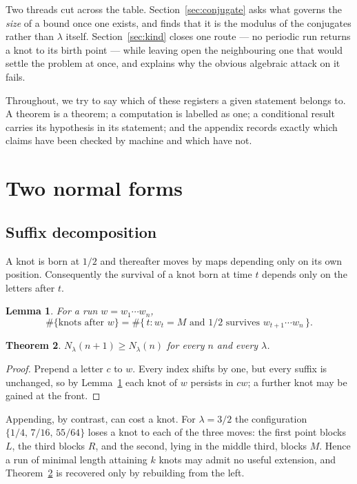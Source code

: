 \documentclass[11pt,reqno]{amsart}
\theoremstyle{plain}
\newtheorem{theorem}{Theorem}
\newtheorem{lemma}[theorem]{Lemma}
\theoremstyle{definition}
\theoremstyle{remark}
\begin{document}
Two threads cut across the table. Section~\ref{sec:conjugate} asks what governs
the \emph{size} of a bound once one exists, and finds that it is the modulus of
the conjugates rather than $\lambda$ itself. Section~\ref{sec:kind} closes one
route --- no periodic run returns a knot to its birth point --- while leaving
open the neighbouring one that would settle the problem at once, and explains
why the obvious algebraic attack on it fails.

Throughout, we try to say which of these registers a given statement belongs
to. A theorem is a theorem; a computation is labelled as one; a conditional
result carries its hypothesis in its statement; and the appendix records
exactly which claims have been checked by machine and which have not.

\section{Two normal forms}\label{sec:normal}

\subsection{Suffix decomposition}

A knot is born at $1/2$ and thereafter moves by maps depending only on its own
position. Consequently the survival of a knot born at time $t$ depends only on
the letters after $t$.

\begin{lemma}\label{lem:suffix}
For a run $w=w_1\cdots w_n$,
\[
  \#\{\text{knots after } w\}
   =\#\{\,t : w_t=M \text{ and } 1/2 \text{ survives } w_{t+1}\cdots w_n\,\}.
\]
\end{lemma}

\begin{theorem}\label{thm:mono}
$N_\lambda(n+1)\geq N_\lambda(n)$ for every $n$ and every $\lambda$.
\end{theorem}

\begin{proof}
Prepend a letter $c$ to $w$. Every index shifts by one, but every suffix is
unchanged, so by Lemma~\ref{lem:suffix} each knot of $w$ persists in $cw$; a
further knot may be gained at the front.
\end{proof}

Appending, by contrast, can cost a knot. For $\lambda=3/2$ the configuration
$\{1/4,\,7/16,\,55/64\}$ loses a knot to each of the three moves: the first
point blocks $L$, the third blocks $R$, and the second, lying in the middle
third, blocks $M$. Hence a run of minimal length attaining $k$ knots may admit
no useful extension, and Theorem~\ref{thm:mono} is recovered only by rebuilding
from the left.
\end{document}

